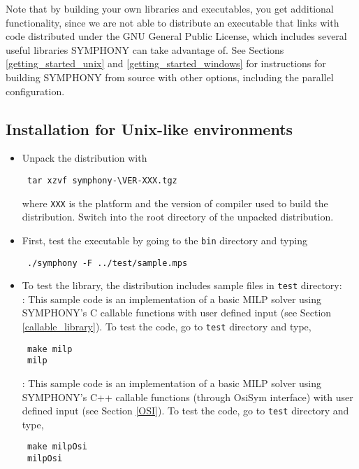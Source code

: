 Note that by building your own libraries and executables, you get additional
functionality, since we are not able to distribute an executable that links
with code distributed under the GNU General Public License, which includes
several useful libraries SYMPHONY can take advantage of. See Sections
\ref{getting_started_unix} and \ref{getting_started_windows} for instructions
for building SYMPHONY from source with other options, including the parallel
configuration.

\subsection{Installation for Unix-like environments}
\begin{itemize}
\item Unpack the distribution with
{\color{Brown}
\begin{verbatim}
 tar xzvf symphony-\VER-XXX.tgz
\end{verbatim}
}
where \texttt{XXX} is the platform and the version of 
compiler used to build the distribution. 
Switch into the root directory of the unpacked distribution. 

\item First, test the executable by going to the \texttt{bin} directory and
typing 
{\color{Brown}
\begin{verbatim}
 ./symphony -F ../test/sample.mps
\end{verbatim}
}
\item To test the library, the distribution
includes sample files in \texttt{test} directory:  \\
: This sample code is an implementation of a basic MILP
solver using SYMPHONY's C callable functions with user defined input (see
Section
\ref{callable_library}). To test the code, go to \texttt{test} directory and
type, {\color{Brown}
\begin{verbatim}
 make milp 
 milp
 \end{verbatim}
}
: This sample code is an implementation of a basic MILP 
solver using SYMPHONY's C++ callable functions (through OsiSym interface)
with user defined input (see Section \ref{OSI}). To test the code, 
go to \texttt{test} directory and type, 
{\color{Brown}
\begin{verbatim}
 make milpOsi
 milpOsi
 \end{verbatim}
}
\end{itemize}


